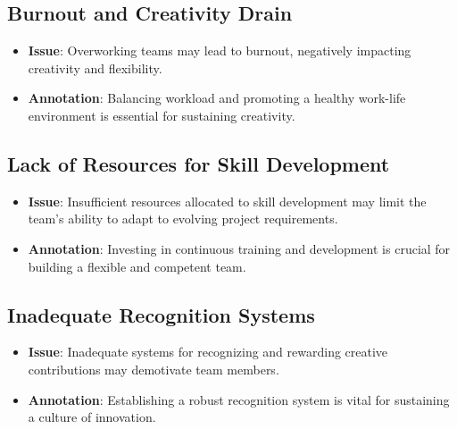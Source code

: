 \documentclass[a4paper, twoside]{article}
\begin{document}
\subsection{Burnout and Creativity Drain}
\begin{itemize}
  \item \textbf{Issue}:  Overworking teams may lead to burnout, negatively impacting creativity and flexibility.
  \item \textbf{Annotation}: Balancing workload and promoting a healthy work-life environment is essential for sustaining creativity.\cite{Amabile2011}
\end{itemize}

\subsection{Lack of Resources for Skill Development}
\begin{itemize}
  \item \textbf{Issue}:  Insufficient resources allocated to skill development may limit the team's ability to adapt to evolving project requirements.
  \item \textbf{Annotation}: Investing in continuous training and development is crucial for building a flexible and competent team.\cite{Noe2010}
\end{itemize}

\subsection{Inadequate Recognition Systems}
\begin{itemize}
  \item \textbf{Issue}:  Inadequate systems for recognizing and rewarding creative contributions may demotivate team members.
  \item \textbf{Annotation}: Establishing a robust recognition system is vital for sustaining a culture of innovation.\cite{Scott1994}
\end{itemize}







\newpage
\printbibliography
\end{document}
